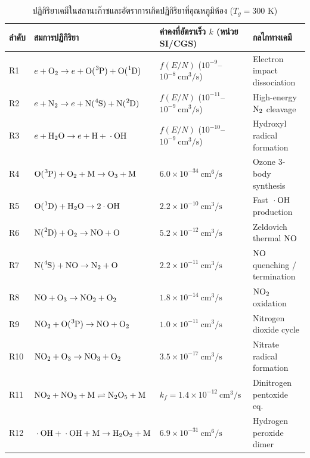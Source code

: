 \begin{table}[H]
\centering
\caption{ปฏิกิริยาเคมีในสถานะก๊าซและอัตราการเกิดปฏิกิริยาที่อุณหภูมิห้อง ($T_g = 300\text{ K}$)}
\label{tab:app_gas_reactions}
\begin{tabularx}{\textwidth}{l l l X}
\toprule
\textbf{ลำดับ} & \textbf{สมการปฏิกิริยา} & \textbf{ค่าคงที่อัตราเร็ว $k$ (หน่วย SI/CGS)} & \textbf{กลไกทางเคมี} \\
\midrule
R1 & $e + \ce{O2} \to e + \ce{O(^3P)} + \ce{O(^1D)}$ & $f(E/N)$ ($10^{-9}$--$10^{-8}\ \si{\centi\meter\cubed\per\second}$) & Electron impact dissociation \\
R2 & $e + \ce{N2} \to e + \ce{N(^4S)} + \ce{N(^2D)}$ & $f(E/N)$ ($10^{-11}$--$10^{-9}\ \si{\centi\meter\cubed\per\second}$) & High-energy $\ce{N2}$ cleavage \\
R3 & $e + \ce{H2O} \to e + \ce{H} + \ce{\cdot OH}$ & $f(E/N)$ ($10^{-10}$--$10^{-9}\ \si{\centi\meter\cubed\per\second}$) & Hydroxyl radical formation \\
R4 & $\ce{O(^3P)} + \ce{O2} + \ce{M} \to \ce{O3} + \ce{M}$ & $6.0 \times 10^{-34}\ \si{\centi\meter\tothe{6}\per\second}$ & Ozone 3-body synthesis \\
R5 & $\ce{O(^1D)} + \ce{H2O} \to 2\ce{\cdot OH}$ & $2.2 \times 10^{-10}\ \si{\centi\meter\cubed\per\second}$ & Fast $\ce{\cdot OH}$ production \\
R6 & $\ce{N(^2D)} + \ce{O2} \to \ce{NO} + \ce{O}$ & $5.2 \times 10^{-12}\ \si{\centi\meter\cubed\per\second}$ & Zeldovich thermal $\ce{NO}$ \\
R7 & $\ce{N(^4S)} + \ce{NO} \to \ce{N2} + \ce{O}$ & $2.2 \times 10^{-11}\ \si{\centi\meter\cubed\per\second}$ & $\ce{NO}$ quenching / termination \\
R8 & $\ce{NO} + \ce{O3} \to \ce{NO2} + \ce{O2}$ & $1.8 \times 10^{-14}\ \si{\centi\meter\cubed\per\second}$ & $\ce{NO2}$ oxidation \\
R9 & $\ce{NO2} + \ce{O(^3P)} \to \ce{NO} + \ce{O2}$ & $1.0 \times 10^{-11}\ \si{\centi\meter\cubed\per\second}$ & Nitrogen dioxide cycle \\
R10 & $\ce{NO2} + \ce{O3} \to \ce{NO3} + \ce{O2}$ & $3.5 \times 10^{-17}\ \si{\centi\meter\cubed\per\second}$ & Nitrate radical formation \\
R11 & $\ce{NO2} + \ce{NO3} + \ce{M} \rightleftharpoons \ce{N2O5} + \ce{M}$ & $k_f = 1.4 \times 10^{-12}\ \si{\centi\meter\cubed\per\second}$ & Dinitrogen pentoxide eq. \\
R12 & $\ce{\cdot OH} + \ce{\cdot OH} + \ce{M} \to \ce{H2O2} + \ce{M}$ & $6.9 \times 10^{-31}\ \si{\centi\meter\tothe{6}\per\second}$ & Hydrogen peroxide dimer \\

\end{tabularx}
\end{table}
